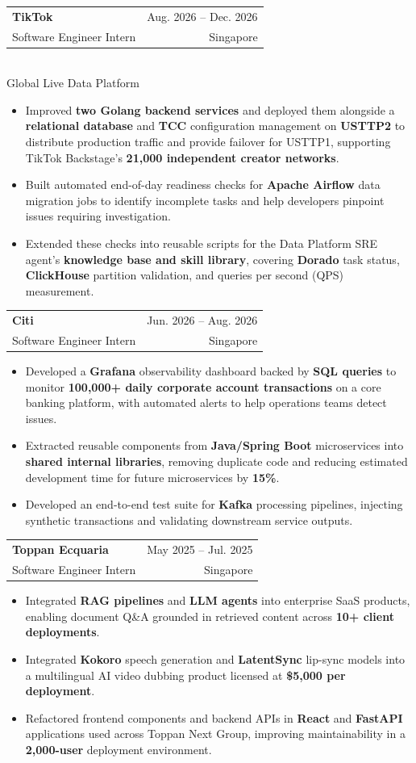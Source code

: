 \documentclass[letterpaper,10pt]{article}
\makeatletter
\newcommand{\resumeItem}[1]{
  \item\small{
    {#1}
  }
}
\newcommand{\resumeSubheading}[4]{
  \vspace{-2pt}\item
    \begin{tabular*}{\textwidth}[t]{l@{\extracolsep{\fill}}r}
      \textbf{#1} & {\color{black}\small #2}\vspace{0pt}\\ %
      #3 & {\color{black} \small #4}\\ %
    \end{tabular*}\vspace{-2pt}
}
\newcommand{\resumeItemListStart}{\begin{itemize}[itemsep=3pt, topsep=4pt]}
\newcommand{\resumeItemListEnd}{\end{itemize}\vspace{-4pt}}
\makeatother
\begin{document}
    \resumeSubheading
      {TikTok}{Aug. 2026 -- Dec. 2026}
      {Software Engineer Intern}{Singapore}
      \vspace{0pt}\\
      \small{Global Live Data Platform}
      \vspace{-2pt}
      \resumeItemListStart
        \resumeItem{Improved \textbf{two Golang backend services} and deployed them alongside a \textbf{relational database} and \textbf{TCC} configuration management on \textbf{USTTP2} to distribute production traffic and provide failover for USTTP1, supporting TikTok Backstage's \textbf{21,000 independent creator networks}.}
        \resumeItem{Built automated end-of-day readiness checks for \textbf{Apache Airflow} data migration jobs to identify incomplete tasks and help developers pinpoint issues requiring investigation.}
        \resumeItem{Extended these checks into reusable scripts for the Data Platform SRE agent's \textbf{knowledge base and skill library}, covering \textbf{Dorado} task status, \textbf{ClickHouse} partition validation, and queries per second (QPS) measurement.}
      \resumeItemListEnd

    \resumeSubheading
      {Citi}{Jun. 2026 -- Aug. 2026}
      {Software Engineer Intern}{Singapore}
      \resumeItemListStart
        \resumeItem{Developed a \textbf{Grafana} observability dashboard backed by \textbf{SQL queries} to monitor \textbf{100,000+ daily corporate account transactions} on a core banking platform, with automated alerts to help operations teams detect issues.}
        \resumeItem{Extracted reusable components from \textbf{Java/Spring Boot} microservices into \textbf{shared internal libraries}, removing duplicate code and reducing estimated development time for future microservices by \textbf{15\%}.}
        \resumeItem{Developed an end-to-end test suite for \textbf{Kafka} processing pipelines, injecting synthetic transactions and validating downstream service outputs.}
      \resumeItemListEnd

    \resumeSubheading
      {Toppan Ecquaria}{May 2025 -- Jul. 2025}
      {Software Engineer Intern}{Singapore}
      \resumeItemListStart
        \resumeItem{Integrated \textbf{RAG pipelines} and \textbf{LLM agents} into enterprise SaaS products, enabling document Q\&A grounded in retrieved content across \textbf{10+ client deployments}.}
        \resumeItem{Integrated \textbf{Kokoro} speech generation and \textbf{LatentSync} lip-sync models into a multilingual AI video dubbing product licensed at \textbf{\$5,000 per deployment}.}
        \resumeItem{Refactored frontend components and backend APIs in \textbf{React} and \textbf{FastAPI} applications used across Toppan Next Group, improving maintainability in a \textbf{2,000-user} deployment environment.}
      \resumeItemListEnd
\end{document}
